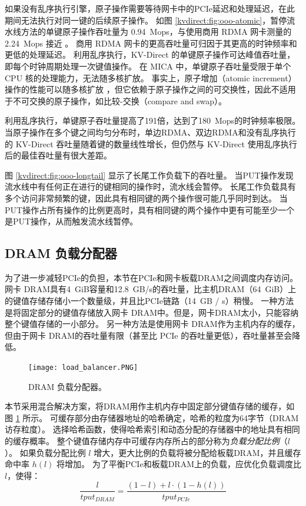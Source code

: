如果没有乱序执行引擎，原子操作需要等待网卡中的PCIe延迟和处理延迟，在此期间无法执行对同一键的后续原子操作。
如图 \ref{kvdirect:fig:ooo-atomic}，暂停流水线方法的单键原子操作吞吐量为 0.94~Mops，与使用商用 RDMA 网卡测量的 2.24~Mops 接近 \cite {kalia2016design}。
商用 RDMA 网卡的更高吞吐量可归因于其更高的时钟频率和更低的处理延迟。
利用乱序执行，KV-Direct 的单键原子操作可达峰值吞吐量，即每个时钟周期处理一次键值操作。
在 MICA \cite {lim2014mica} 中，单键原子吞吐量受限于单个 CPU 核的处理能力，无法随多核扩放。
事实上，原子增加（atomic increment）操作的性能可以随多核扩放 \cite {kalia2016design}，但它依赖于原子操作之间的可交换性，因此不适用于不可交换的原子操作，如比较-交换（compare and swap）。

利用乱序执行，单键原子吞吐量提高了191倍，达到了180~Mops的时钟频率极限。
当原子操作在多个键之间均匀分布时，单边RDMA、双边RDMA和没有乱序执行的 KV-Direct 吞吐量随着键的数量线性增长，但仍然与 KV-Direct 使用乱序执行后的最佳吞吐量有很大差距。

图 \ref {kvdirect:fig:ooo-longtail} 显示了长尾工作负载下的吞吐量。
当PUT操作发现流水线中有任何正在进行的键相同的操作时，流水线会暂停。
长尾工作负载具有多个访问非常频繁的键，因此具有相同键的两个操作很可能几乎同时到达。
当PUT操作占所有操作的比例更高时，具有相同键的两个操作中更有可能至少一个是PUT操作，从而触发流水线暂停。





\subsection{DRAM 负载分配器}
\label{kvdirect:sec:dram-cache}

为了进一步减轻PCIe的负担，本节在PCIe和网卡板载DRAM之间调度内存访问。
网卡 DRAM具有4~GiB容量和12.8~GB/s的吞吐量，比主机DRAM（64~GiB）上的键值存储存储小一个数量级，并且比PCIe链路（14~GB / s）稍慢。
一种方法是将固定部分的键值存储放入网卡 DRAM中。但是，网卡DRAM太小，只能容纳整个键值存储的一小部分。
另一种方法是使用网卡 DRAM作为主机内存的缓存，但由于网卡 DRAM的吞吐量有限（甚至比 PCIe 的吞吐量更低），吞吐量甚至会降低。


\begin{figure}[htbp]
	\centering
	\texttt{[image: load\_balancer.PNG]}
	\caption{DRAM 负载分配器。}
	\label{kvdirect:fig:cache}
\end{figure}


本节采用混合解决方案，将DRAM用作主机内存中固定部分键值存储的缓存，如图 \ref {kvdirect:fig:cache} 所示。
可缓存部分由存储器地址的哈希确定，哈希的粒度为64字节（DRAM 访存粒度）。
选择哈希函数，使得哈希索引和动态分配的存储器中的地址具有相同的缓存概率。
整个键值存储内存中可缓存内存所占的部分称为\textit {负载分配比例}（$ l $）。
如果负载分配比例 $ l $ 增大，更大比例的负载将被分配给板载DRAM，并且缓存命中率 $h(l)$ 将增加。
为了平衡PCIe和板载DRAM上的负载，应优化负载调度比$ l $，使得：
$$\frac{l}{tput_{DRAM}} = \frac{(1-l) + l \cdot (1-h(l))}{tput_{PCIe}}$$

